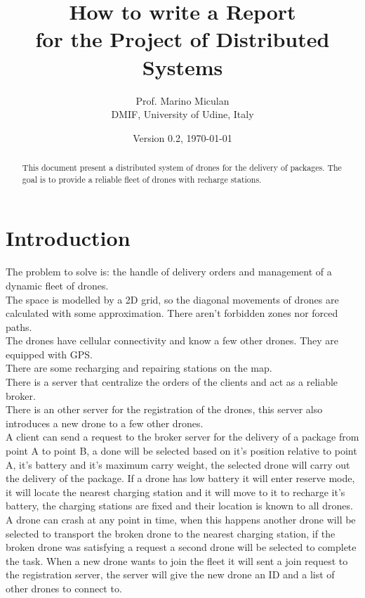 \documentclass[a4paper, oneside]{memoir}
\title{How to write a Report\\ for the Project of Distributed Systems}
\author{Prof. Marino Miculan\\ DMIF, University of Udine, Italy}
\date{Version 0.2, \today}
\begin{document}
\maketitle
\begin{abstract}
This document present a distributed system of drones for the delivery of packages. The goal is to provide a reliable fleet of drones with recharge stations.
\end{abstract}

\chapter{Introduction}\label{ch:intro}

The problem to solve is: the handle of delivery orders and management of a dynamic fleet of drones.\\
The space is modelled by a 2D grid, so the diagonal movements of drones are calculated with some approximation. There aren't forbidden zones nor forced paths.\\
The drones have cellular connectivity and know a few other drones. They are equipped with GPS.\\
There are some recharging and repairing stations on the map.\\
There is a server that centralize the orders of the clients and act as a reliable broker.\\
There is an other server for the registration of the drones, this server also introduces a new drone to a few other drones.
\\

A client can send a request to the broker server for the delivery of a package from point A to point B, a done will be selected based on it's position relative to point A, it's  battery and it's maximum carry weight, the selected drone will carry out the delivery of the package.
If a drone has low battery it will enter reserve mode, it will locate the nearest charging station and it will move to it to recharge it's battery, the charging stations are fixed and their location is known to all drones.
A drone can crash at any point in time, when this happens another drone will be selected to transport the broken drone to the nearest charging station, if the broken drone was satisfying a request a second drone will be selected to complete the task.
When a new drone wants to join the fleet it will sent a join request to the registration server, the server will give the new drone an ID and a list of other drones to connect to.
\end{document}
